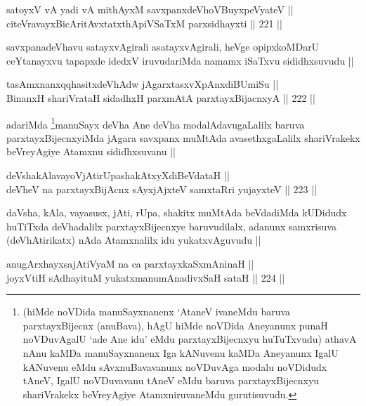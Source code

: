 \begin{shl}
satoyxV vA yadi vA mithAyxM savxpanxdeVhoV\s BuyxpeVyateV || \\
citeVravayxBicAritAvxtatxthA\s piVSaTxM parxsidhayxti ||  221 ||  
\end{shl}

\begin{artha}
savxpanadeVhavu satayxvAgirali asatayxvAgirali, heVge opipxkoMDarU ceYtanayxvu tapapxde idedxV iruvudariMda namamx iSaTxvu sididhxsuvudu ||
\end{artha}

\begin{shl}
tasAmxnanxqqhasitxdeVhAdw jAgarxtasxvXpAnxdiBUmiSu || \\
BinanxH shariVrataH sidadhxH parxmAtA parxtayxBijacnxyA ||  222 || 
\end{shl}

\begin{artha}
adariMda \footnote{(hiMde noVDida manuSayxnanenx `AtaneV ivaneMdu baruva parxtayxBijecnx (anuBava), hAgU hiMde noVDida Aneyanunx punaH noVDuvAgalU `ade Ane idu' eMdu parxtayxBijecnxyu huTuTxvudu) athavA nAnu kaMDa manuSayxnanenx Iga kANuvenu kaMDa Aneyanunx IgalU kANuvenu eMdu sAvxnuBavavanunx  noVDuvAga modalu noVDidudx tAneV, IgalU noVDuvavanu tAneV eMdu baruva parxtayxBijecnxyu shariVrakekx beVreyAgiye AtamxniruvaneMdu gurutisuvudu.}manuSayx deVha Ane deVha modalAdavugaLalilx baruva parxtayxBijecnxyiMda jAgara savxpanx muMtAda avasethxgaLalilx shariVrakekx beVreyAgiye Atamxnu sididhxsuvanu ||
\end{artha}

\begin{shl}
deVshakAlavayoVjAtirUpashakAtxyXdiBeVdataH || \\
deVheV na parxtayxBijAcnx sAyxjAjxteV samxtaRri yujayxteV ||  223 ||  
\end{shl}

\begin{artha}
daVsha, kAla, vayasusx, jAti, rUpa, shakitx muMtAda beVdadiMda kUDidudx huTiTxda deVhadalilx parxtayxBijecnxye baruvudilalx, adanunx samxrisuva (deVhAtirikatx) nAda Atamxnalilx idu yukatxvAguvudu ||
\end{artha}

\begin{shl}
anugArxhayxsajAtiVyaM na ca parxtayxkaSxmAninaH || \\
joyxVtiH sAdhayituM yukatxmanumAnadivxSaH sataH ||  224 ||  
\end{shl}

